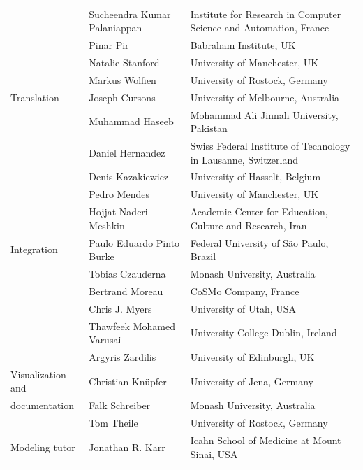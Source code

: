 \documentclass[journal,transmag]{IEEEtran}
\begin{document}
\begin{table}[ht!]
\begin{tabularx}{\textwidth}{l||l||X}
                       & Sucheendra Kumar Palaniappan     & Institute for Research in Computer Science and Automation, France\\
                       & Pinar Pir                        & Babraham Institute, UK\\
                       & Natalie Stanford                 & University of Manchester, UK\\
                       & Markus Wolfien                   & University of Rostock, Germany\\\hline
Translation            & Joseph Cursons                   & University of Melbourne, Australia\\
                       & Muhammad Haseeb                  & Mohammad Ali Jinnah University, Pakistan\\
                       & Daniel Hernandez                 & Swiss Federal Institute of Technology in Lausanne, Switzerland\\
                       & Denis Kazakiewicz                & University of Hasselt, Belgium\\
                       & Pedro Mendes                     & University of Manchester, UK\\
                       & Hojjat Naderi Meshkin            & Academic Center for Education, Culture and Research, Iran\\\hline
Integration            & Paulo Eduardo Pinto Burke        & Federal University of S\~ao Paulo, Brazil\\
                       & Tobias Czauderna                 & Monash University, Australia\\
                       & Bertrand Moreau                  & CoSMo Company, France\\
                       & Chris J. Myers                   & University of Utah, USA\\
		               & Thawfeek Mohamed Varusai         & University College Dublin, Ireland\\
		               & Argyris Zardilis                 & University of Edinburgh, UK\\\hline
Visualization and      & Christian Kn\"upfer              & University of Jena, Germany\\
documentation          & Falk Schreiber                   & Monash University, Australia\\
                       & Tom Theile                       & University of Rostock, Germany\\\hline
Modeling tutor         & Jonathan R. Karr                 & Icahn School of Medicine at Mount Sinai, USA\\\hline
\end{tabularx}
\end{table}
\end{document}
